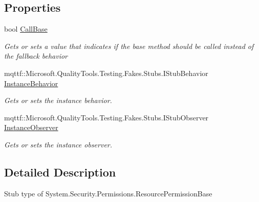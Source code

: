 \subsection*{Properties}
\begin{DoxyCompactItemize}
\item 
bool \hyperlink{class_system_1_1_security_1_1_permissions_1_1_fakes_1_1_stub_resource_permission_base_a46639122a16262f420ccc9a5cc5d9688}{Call\-Base}
\begin{DoxyCompactList}\small\item\em Gets or sets a value that indicates if the base method should be called instead of the fallback behavior\end{DoxyCompactList}\item 
mqttf\-::\-Microsoft.\-Quality\-Tools.\-Testing.\-Fakes.\-Stubs.\-I\-Stub\-Behavior \hyperlink{class_system_1_1_security_1_1_permissions_1_1_fakes_1_1_stub_resource_permission_base_a228434c68ccd38cb4e426158b642c4c0}{Instance\-Behavior}
\begin{DoxyCompactList}\small\item\em Gets or sets the instance behavior.\end{DoxyCompactList}\item 
mqttf\-::\-Microsoft.\-Quality\-Tools.\-Testing.\-Fakes.\-Stubs.\-I\-Stub\-Observer \hyperlink{class_system_1_1_security_1_1_permissions_1_1_fakes_1_1_stub_resource_permission_base_a06130f138181c881473ead53f3e7208b}{Instance\-Observer}
\begin{DoxyCompactList}\small\item\em Gets or sets the instance observer.\end{DoxyCompactList}\end{DoxyCompactItemize}


\subsection{Detailed Description}
Stub type of System.\-Security.\-Permissions.\-Resource\-Permission\-Base



